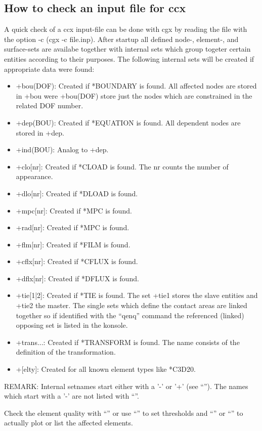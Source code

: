 \documentclass{article}
\begin{document}
\begin{appendix}
\subsection{\label{How to check an input file for ccx}How to check an input file for ccx}
A quick check of a ccx input-file can be done with cgx by reading the file with the option -c (cgx -c file.inp). After startup all defined node-, element-, and surface-sets are availabe together with internal sets which group togeter certain entities according to their purposes. The following internal sets will be created if appropriate data were found: 
\begin{itemize}
\item +bou(DOF):  Created if *BOUNDARY is found. All affected nodes are stored in +bou were +bou(DOF) store just the nodes which are constrained in the related DOF number.
\item +dep(BOU):  Created if *EQUATION is found. All dependent nodes are stored in +dep.
\item +ind(BOU):  Analog to +dep.
\item +clo[nr]:   Created if *CLOAD is found. The nr counts the number of appearance.
\item +dlo[nr]:   Created if *DLOAD is found.
\item +mpc[nr]:   Created if *MPC is found.
\item +rad[nr]:   Created if *MPC is found.
\item +flm[nr]:   Created if *FILM is found.
\item +cflx[nr]:  Created if *CFLUX is found.
\item +dflx[nr]:  Created if *DFLUX is found.
\item +tie[1|2]:  Created if *TIE is found. The set +tie1 stores the slave entities and +tie2 the master. The single sets which define the contact areas are linked together so if identified with the ``qenq'' command the referenced (linked) opposing set is listed in the konsole.
\item +trans...:  Created if *TRANSFORM is found. The name consists of the definition of the transformation.
\item +[elty]:    Created for all known element types like *C3D20.
\end{itemize}
REMARK: Internal setnames start either with a '-' or '+' (see ``''). The names which start with a '-' are not listed with ``''. 

Check the element quality with ``'' or use ``'' to set thresholds and
``'' or ``'' to actually plot or list the affected elements.


\end{appendix}
\end{document}
